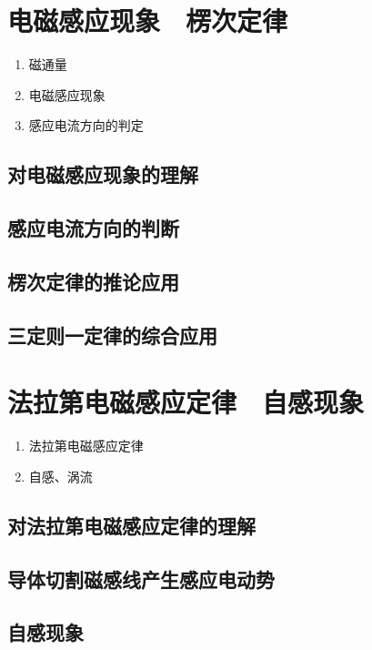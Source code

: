\documentclass[cn,11pt,mac, simple]{elegantbook}
\begin{document}
\chapter{电磁感应现象　楞次定律}
\begin{enumerate}
   \item 磁通量
   \item 电磁感应现象
   \item 感应电流方向的判定
\end{enumerate}

\clearpage\section{对电磁感应现象的理解}

\clearpage\section{感应电流方向的判断}

\clearpage\section{楞次定律的推论应用}

\clearpage\section{三定则一定律的综合应用}

\chapter{法拉第电磁感应定律　自感现象}
\begin{enumerate}
   \item 法拉第电磁感应定律
   \item 自感、涡流
\end{enumerate}

\clearpage\section{对法拉第电磁感应定律的理解}

\clearpage\section{导体切割磁感线产生感应电动势}

\clearpage\section{自感现象}
\end{document}
